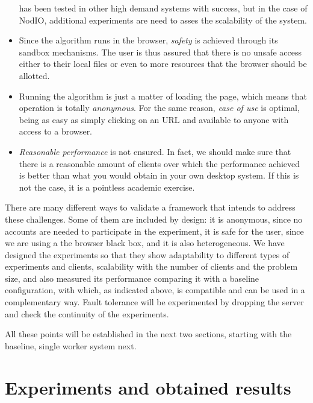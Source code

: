 \documentclass[journal,onecolumn]{IEEEtran}
\begin{document}
\begin{itemize}
  has been tested in other high demand systems with success, but 
  in the case of NodIO, additional experiments are need to asses 
  the scalability of the system. 
\item Since the algorithm runs in the browser, {\em safety} is
  achieved through its sandbox mechanisms. The user is thus assured
  that there is no unsafe access either to their local files or even
  to more resources that the browser should be allotted.
\item Running the algorithm is just a matter of loading the page,
  which means that operation is totally {\em anonymous}. For the same
  reason, {\em ease of use} is optimal, being as easy as simply
  clicking on an URL and available to anyone with access to a browser.
\item {\em Reasonable performance} is not ensured. In fact, we should
  make sure that there is a reasonable amount of clients over which
  the performance achieved is better than what you would obtain in
  your own desktop system. If this is not the case, it is a pointless
  academic exercise.
\end{itemize}

There are many different ways to validate a framework that intends to
address these challenges. Some of them are included by design: it is
anonymous, since no accounts are needed to participate in the
experiment, it is safe for the user, since we are using a the browser
black box, and it is also heterogeneous. We have designed the
experiments so that they show adaptability to different types of
experiments and clients, scalability with the number of clients and
the problem size, and also measured its performance comparing it with
a baseline configuration, with which, as indicated above, is
compatible and can be used in a complementary way. Fault tolerance
will be experimented by dropping the server and check the continuity
of the experiments. 

All these points will be established in the next two sections,
starting with the baseline, single worker system next. 

\section{Experiments and obtained results}
\label{sec:experiments}
\end{document}
